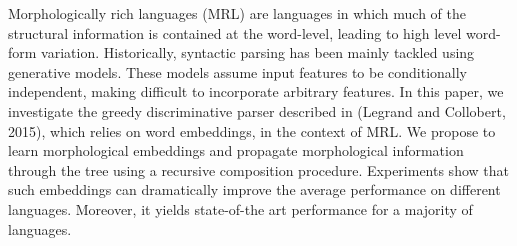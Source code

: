 Morphologically rich languages (MRL) are languages in which much of the structural information is contained at the word-level, leading to high level word-form variation. Historically, syntactic parsing has been mainly tackled using generative models. These models assume input features to be conditionally independent, making difficult to incorporate arbitrary features. In this paper, we investigate the greedy discriminative parser described in (Legrand and Collobert, 2015), which relies on word embeddings, in the context of MRL. We propose to learn morphological embeddings and propagate morphological information through the tree using a recursive composition procedure. Experiments show that such embeddings can dramatically improve the average performance on different languages. Moreover, it yields state-of-the art performance for a majority of languages.

